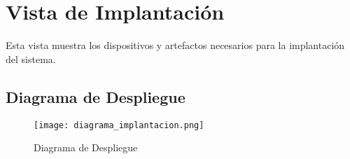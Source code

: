 \section{Vista de Implantación} \label{vistaImplantacion}
Esta vista muestra los dispositivos y artefactos necesarios para la implantación del sistema.

\subsection{Diagrama de Despliegue}
\begin{figure}[H]
    \texttt{[image: diagrama\_implantacion.png]}
    \caption{Diagrama de Despliegue}
    \label{fig:diagrama_implantacion}
    \centering
\end{figure}